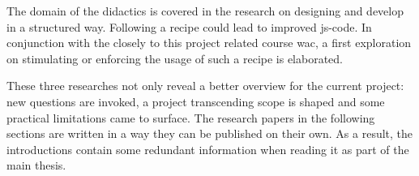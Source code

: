 The domain of the didactics is covered in the research on designing and develop
in a structured way. Following a recipe could lead to improved \gls{js-code}. In
conjunction with the closely to this project related course \gls{wac}, a first
exploration on stimulating or enforcing the usage of such a recipe is elaborated.

These three researches not only reveal a better overview for the current project:
new questions are invoked, a project transcending scope is shaped and some practical
limitations came to surface. The research papers in the following sections are
written in a way they can be published on their own. As a result, the introductions
contain some redundant information when reading it as part of the main thesis.